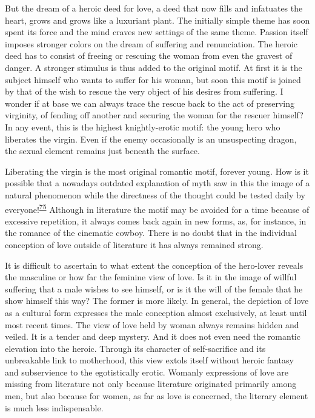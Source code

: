 But the dream of a heroic deed for love, a deed that now fills and
infatuates the heart, grows and grows like a luxuriant plant. The
initially simple theme has soon spent its force and the mind craves new
settings of the same theme. Passion itself imposes stronger colors on
the dream of suffering and renunciation. The heroic deed has to consist
of freeing or rescuing the woman from even the gravest of danger. A
stronger stimulus is thus added to the original motif. At first it is
the subject himself who wants to suffer for his woman, but soon this
motif is joined by that of the wish to rescue the very object of his
desires from suffering. I wonder if at base we can always trace the
rescue back to the act of preserving virginity, of fending off another
and securing the woman for the rescuer himself? In any event, this is
the highest knightly-erotic motif: the young hero who liberates the
virgin. Even if the enemy occasionally is an unsuspecting dragon, the
sexual element remains just beneath the surface.

Liberating the virgin is the most original romantic motif, forever
young. How is it possible that a nowadays outdated explanation of myth
saw in this the image of a natural phenomenon while the directness of
the thought could be tested daily by
everyone!\textsuperscript{\protect\hypertarget{10_Chapter_Three__THE_HEROIC_DREAM.xhtmlux5cux23id_1784}{\protect\hyperlink{23_NOTES.xhtmlux5cux23id_1785}{75}}}
Although in literature the motif may be avoided for a time because of
excessive repetition, it always comes back again in new forms, as, for
instance, in the romance of the cinematic cowboy. There is no doubt that
in the individual conception of love outside of literature it has always
remained strong.

It is difficult to ascertain to what extent the conception of the
hero-lover reveals the masculine or how far the feminine view of
\protect\hypertarget{10_Chapter_Three__THE_HEROIC_DREAM.xhtmlux5cux23page_84}{}{}love.
Is it in the image of willful suffering that a male wishes to see
himself, or is it the will of the female that he show himself this way?
The former is more likely. In general, the depiction of love as a
cultural form expresses the male conception almost exclusively, at least
until most recent times. The view of love held by woman always remains
hidden and veiled. It is a tender and deep mystery. And it does not even
need the romantic elevation into the heroic. Through its character of
self-sacrifice and its unbreakable link to motherhood, this view extols
itself without heroic fantasy and subservience to the egotistically
erotic. Womanly expressions of love are missing from literature not only
because literature originated primarily among men, but also because for
women, as far as love is concerned, the literary element is much less
indispensable.

